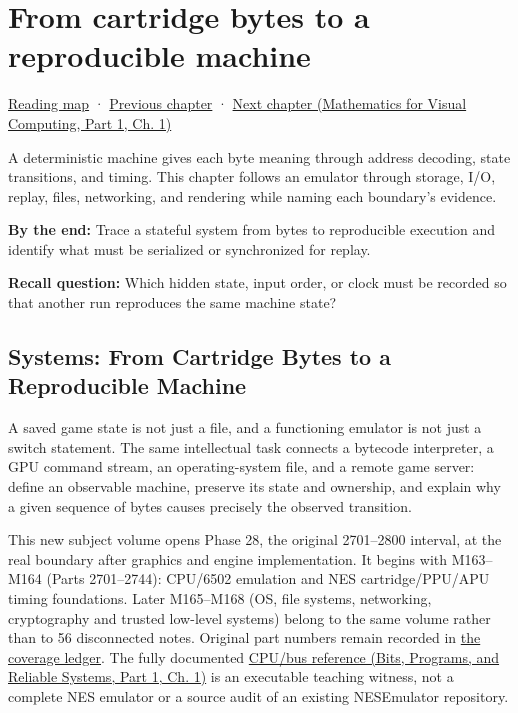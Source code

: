 \chapter{From cartridge bytes to a reproducible machine}\label{06-engine-ii-ch042-from-cartridge-bytes-to-a-reproducible-machine}\hypertarget{06-engine-ii-ch042}{}\label{stagechapter:06-engine-ii-ch042}

\hypertarget{06-engine-ii-ch042-from-cartridge-bytes-to-a-reproducible-machine}{}

\hyperref[volume-reading-map]{Reading map} · \hyperref[03-visual-computing-i-ch018]{Previous chapter} · \href{../02-Mathematics-for-Visual-Computing-P01/main.pdf\#nameddest=01-foundations-i-ch017}{Next chapter (Mathematics for Visual Computing, Part 1, Ch. 1)}

A deterministic machine gives each byte meaning through address decoding, state transitions, and timing. This chapter follows an emulator through storage, I/O, replay, files, networking, and rendering while naming each boundary's evidence.

\textbf{By the end:} Trace a stateful system from bytes to reproducible execution and identify what must be serialized or synchronized for replay.

\textbf{Recall question:} Which hidden state, input order, or clock must be recorded so that another run reproduces the same machine state?

\section{Systems: From Cartridge Bytes to a Reproducible Machine}\label{06-engine-ii-ch042-systems-from-cartridge-bytes-to-a-reproducible-machine}

\hypertarget{06-engine-ii-ch042-systems-from-cartridge-bytes-to-a-reproducible-machine}{}

A saved game state is not just a file, and a functioning emulator is not just a switch statement. The same intellectual task connects a bytecode interpreter, a GPU command stream, an operating-system file, and a remote game server: define an observable machine, preserve its state and ownership, and explain why a given sequence of bytes causes precisely the observed transition.

This new subject volume opens Phase 28, the original 2701--2800 interval, at the real boundary after graphics and engine implementation. It begins with M163--M164 (Parts 2701--2744): CPU/6502 emulation and NES cartridge/PPU/APU timing foundations. Later M165--M168 (OS, file systems, networking, cryptography and trusted low-level systems) belong to the same volume rather than to 56 disconnected notes. Original part numbers remain recorded in \hyperref[appendix-fd090d982a15-phase-28-m163m168-parts-27012800-deterministic-and-trusted-low-level-systems]{the coverage ledger}. The fully documented \href{../01-Bits-Programs-and-Reliable-Systems-P01/main.pdf\#nameddest=source-file-552a9e2296dc984412c8f06d}{CPU/bus reference (Bits, Programs, and Reliable Systems, Part 1, Ch. 1)} is an executable teaching witness, not a complete NES emulator or a source audit of an existing NESEmulator repository.

